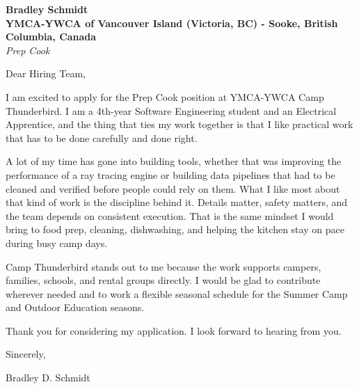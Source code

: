 \documentclass[11pt]{article}
\begin{document}
\textbf{Bradley Schmidt}\\
\vspace{0.5em}
\textbf{YMCA-YWCA of Vancouver Island (Victoria, BC) - Sooke, British Columbia, Canada}\\
\textit{Prep Cook}

Dear Hiring Team,

\par

I am excited to apply for the Prep Cook position at YMCA-YWCA Camp Thunderbird. I am a 4th-year Software Engineering student and an Electrical Apprentice, and the thing that ties my work together is that I like practical work that has to be done carefully and done right.

\par

A lot of my time has gone into building tools, whether that was improving the performance of a ray tracing engine or building data pipelines that had to be cleaned and verified before people could rely on them. What I like most about that kind of work is the discipline behind it. Details matter, safety matters, and the team depends on consistent execution. That is the same mindset I would bring to food prep, cleaning, dishwashing, and helping the kitchen stay on pace during busy camp days.

\par

Camp Thunderbird stands out to me because the work supports campers, families, schools, and rental groups directly. I would be glad to contribute wherever needed and to work a flexible seasonal schedule for the Summer Camp and Outdoor Education seasons.

\par

Thank you for considering my application. I look forward to hearing from you.

\par

Sincerely,

\par

Bradley D. Schmidt
\end{document}
